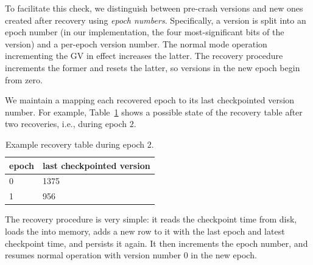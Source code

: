 To facilitate this check, we distinguish between pre-crash versions and new ones created after recovery using \emph{epoch numbers}. 
Specifically, a version is split into an epoch number (in our implementation, the four most-significant bits of the version) and a per-epoch version number. 
The normal mode operation incrementing the GV in effect increases the latter. The recovery procedure increments the former and resets the latter, so 
versions in the new epoch begin from zero. 

We maintain a  mapping each recovered epoch to its last checkpointed version number. 
For example, Table~\ref{table:recovery} shows a possible state of the recovery table after two recoveries, i.e., during epoch $2$. 

\begin{table}[h]
\begin{center}
\begin{tabular}{ll}
epoch & last checkpointed version \\
\hline
0 & 1375\\
1 &  956\\
\end{tabular}
\end{center}
\caption{Example recovery table during epoch $2$.}
\label{table:recovery}
\end{table} 
 
The recovery procedure is very simple: it reads the checkpoint time from disk, loads the  into memory, adds a new row to it with the last epoch and latest checkpoint time, and persists it again. It then increments the epoch number, and resumes normal operation with version number $0$ in the new epoch.












